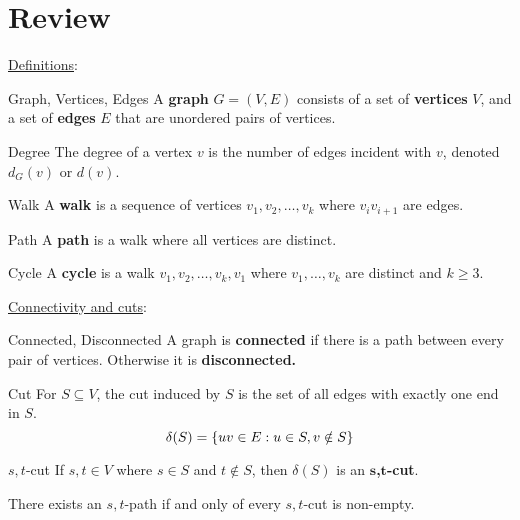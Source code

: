 \chapter{Review}

\underline{Definitions}:
\begin{Definition}{Graph, Vertices, Edges}{}
    A \textbf{graph} $ G=(V,E) $ consists of a set of \textbf{vertices}
    $ V $, and a set of \textbf{edges} $ E $ that are unordered pairs of vertices.
\end{Definition}
\begin{Definition}{Degree}{}
    The degree of a vertex $ v $ is the number of edges incident with $ v $,
    denoted $ d_G(v) $ or $ d(v) $.
\end{Definition}
\begin{Definition}{Walk}{}
    A \textbf{walk} is a sequence of vertices $ v_1,v_2,\ldots,v_k $
    where $ v_i v_{i+1} $ are edges.
\end{Definition}
\begin{Definition}{Path}{}
    A \textbf{path} is a walk where all vertices are distinct.
\end{Definition}
\begin{Definition}{Cycle}{}
    A \textbf{cycle} is a walk $ v_1,v_2,\ldots,v_k,v_1 $
    where $ v_1,\ldots,v_k $ are distinct and $ k\geqslant 3 $.
\end{Definition}

\underline{Connectivity and cuts}:
\begin{Definition}{Connected, Disconnected}{}
    A graph is \textbf{connected} if there is a path between every pair of vertices.
    Otherwise it is \textbf{disconnected.}
\end{Definition}
\begin{Definition}{Cut}{}
    For $ S\subseteq V $, the cut induced by $ S $ is the set of all edges with exactly one end
    in $ S $.
    \[ \delta(S)=\{uv\in E: u\in S, v\notin S\} \]
\end{Definition}
\begin{Definition}{$ s,t $-cut}{}
    If $ s,t\in V $ where $ s\in S $ and $ t\notin S $, then $ \delta(S) $ is an
    \textbf{$\bm{s}$,$\bm{t}$-cut}.
\end{Definition}
\begin{Proposition}{}{}
    There exists an $ s,t $-path if and only of every $ s,t $-cut
    is non-empty.
\end{Proposition}

